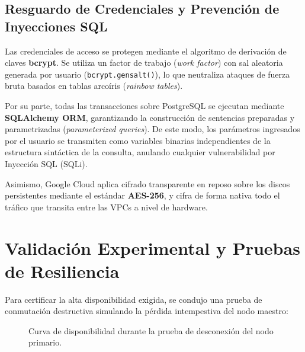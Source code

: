 \documentclass[12pt]{article}
\begin{document}
\subsection{Resguardo de Credenciales y Prevención de Inyecciones SQL}
Las credenciales de acceso se protegen mediante el algoritmo de derivación de claves \textbf{bcrypt}. Se utiliza un factor de trabajo (\textit{work factor}) con sal aleatoria generada por usuario (\texttt{bcrypt.gensalt()}), lo que neutraliza ataques de fuerza bruta basados en tablas arcoíris (\textit{rainbow tables}).

Por su parte, todas las transacciones sobre PostgreSQL se ejecutan mediante \textbf{SQLAlchemy ORM}, garantizando la construcción de sentencias preparadas y parametrizadas (\textit{parameterized queries}). De este modo, los parámetros ingresados por el usuario se transmiten como variables binarias independientes de la estructura sintáctica de la consulta, anulando cualquier vulnerabilidad por Inyección SQL (SQLi).

Asimismo, Google Cloud aplica cifrado transparente en reposo sobre los discos persistentes mediante el estándar \textbf{AES-256}, y cifra de forma nativa todo el tráfico que transita entre las VPCs a nivel de hardware.


\section{Validación Experimental y Pruebas de Resiliencia}

Para certificar la alta disponibilidad exigida, se condujo una prueba de conmutación destructiva simulando la pérdida intempestiva del nodo maestro:

\begin{figure}[H]
\centering
{}
\caption{Curva de disponibilidad durante la prueba de desconexión del nodo primario.}
\label{fig:failover-grafica}
\end{figure}
\end{document}
